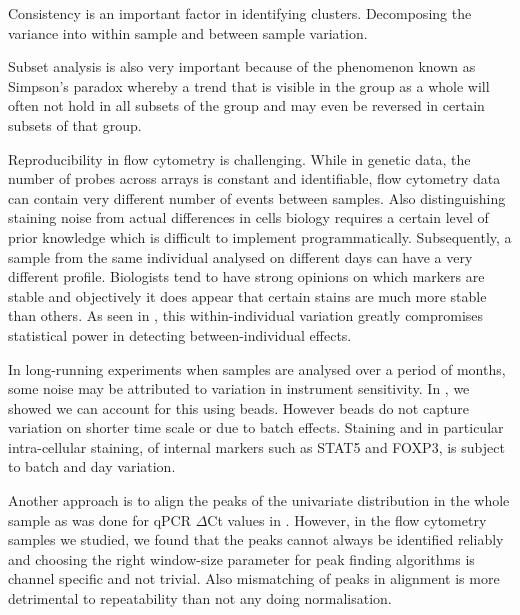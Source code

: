 Consistency is an important factor in identifying clusters.
Decomposing the variance into within sample and between sample variation.

Subset analysis is also very important because of the phenomenon known as Simpson’s paradox whereby a trend that is visible in the group as a whole will often not hold in all subsets of the group and may even be reversed in certain subsets of that group.



Reproducibility in flow cytometry is challenging.
While in genetic data, the number of probes across arrays is constant and identifiable,
flow cytometry data can contain very different number of events between samples.
Also distinguishing staining noise from actual differences in cells biology requires a certain level of prior knowledge which is difficult to implement programmatically.
Subsequently, a sample from the same individual analysed on different days can have a very different profile.
Biologists tend to have strong opinions on which markers are stable and objectively it does appear that certain stains are much more stable than others.
As seen in , this within-individual variation greatly compromises statistical power in detecting between-individual effects.

In long-running experiments when samples are analysed over a period of months, some noise may be attributed to variation in instrument sensitivity.
In , we showed we can account for this using beads.
However beads do not capture variation on shorter time scale or due to batch effects.
Staining and in particular intra-cellular staining, of internal markers such as STAT5 and FOXP3, is subject to batch and day variation.

Another approach is to align the peaks of the univariate distribution in the whole sample as was done for qPCR $\Delta$Ct values in .
However, in the flow cytometry samples we studied, we found that the peaks cannot always be identified reliably and choosing the right window-size parameter for peak finding algorithms is channel specific and not trivial.
Also mismatching of peaks in alignment is more detrimental to repeatability than not any doing normalisation.

